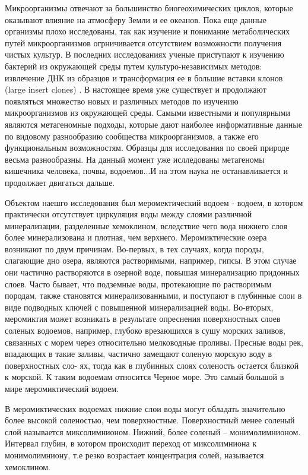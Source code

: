 Микроорганизмы отвечают за большинство биогеохимических циклов, которые оказывают влияние на атмосферу Земли и ее океанов. Пока еще данные организмы плохо исследованы, так как изучение и понимание метаболических путей микроорганизмов огрничивается отсутствием возможности получения чистых культур. В последних исследованиях ученые приступают к изучению бактерий из окружающей среды путем культуро-независимых методов: извлечение ДНК из образцов и трансформация ее в большие вставки клонов (large insert clones) . В настоящее время уже существует и продолжают появляться множество новых и различных методов по изучению микроорганизмов из окружающей среды. Самыми известными и популярными являются метагеномные подходы, которые дают наиболее информативные данные по видовому разнообразию сообщества микроорганизмов, а также его функциональным возможностям. Образцы для исследования по своей природе весьма разнообразны. На данный момент уже ислледованы метагеномы кишечника человека, почвы, водоемов...И на этом наука не останавливается и продолжает двигаться дальше.

Объектом наешго исследования был меромектический водоем - водоем, в котором практически
отсутствует циркуляция воды между слоями различной минерализации, разделенные хемоклином, вследствие чего вода нижнего слоя более минерализована и плотная, чем верхнего.
Меромиктические озера возникают по двум причинам. Во-первых, в тех случаях, когда породы, слагающие дно озера, являются растворимыми, например, гипсы. В этом случае они
частично растворяются в озерной воде, повышая минерализацию придонных слоев. Часто
бывает, что подземные воды, протекающие по растворимым породам, также становятся минерализованными, и поступают в глубинные слои в виде подводных ключей с повышенной
минерализацией воды. Во-вторых, меромиктия может возникать в результате опреснения
поверхностных слоев соленых водоемов, например, глубоко врезающихся в сушу морских
заливов, связанных с морем через относительно мелководные проливы. Пресные воды рек,
впадающих в такие заливы, частично замещают соленую морскую воду в поверхностных сло-
ях, тогда как в глубинных слоях соленость остается близкой к морской. К таким водоемам
относится Черное море. Это самый большой в мире меромиктический водоем.

В меромиктических водоемах нижние слои воды могут обладать значительно более высокой соленостью, чем поверхностные. Поверхностный менее соленый слой называется миксолимнионом. Нижний, более соленый – монимолимнионом. Интервал глубин, в котором происходит переход от миксолимниона к монимолимниону, т.е резко возрастает концентрация
солей, называется хемоклином.

